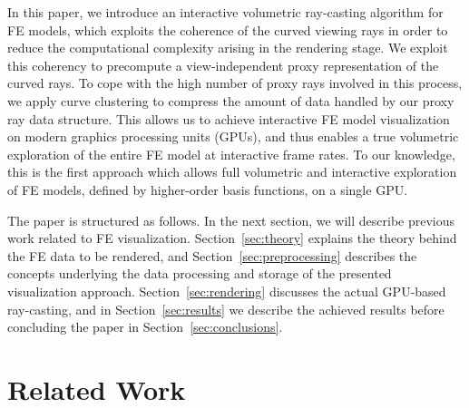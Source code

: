 \documentclass[review,journal]{vgtc}         %
\begin{document}
In this paper, we introduce an interactive volumetric ray-casting algorithm for FE models, which exploits the coherence of the curved viewing rays in order to reduce the computational complexity arising in the rendering stage. We exploit this coherency to precompute a view-independent proxy representation of the curved rays. To cope with the high number of proxy rays involved in this process, we apply curve clustering to compress the amount of data handled by our proxy ray data structure. This allows us to achieve interactive FE model visualization on modern graphics processing units (GPUs), and thus enables a true volumetric exploration of the entire FE model at interactive frame rates. To our knowledge, this is the first approach which allows full volumetric and interactive exploration of FE models, defined by higher-order basis functions, on a single GPU.

The paper is structured as follows. In the next section, we will describe previous work related to FE visualization. Section~\ref{sec:theory} explains the theory behind the FE data to be rendered, and Section~\ref{sec:preprocessing} describes the concepts underlying the data processing and storage of the presented visualization approach. Section~\ref{sec:rendering} discusses the actual GPU-based ray-casting, and in Section~\ref{sec:results} we describe the achieved results before concluding the paper in Section~\ref{sec:conclusions}.



\section{Related Work}\label{sec:relatedwork}
\end{document}
